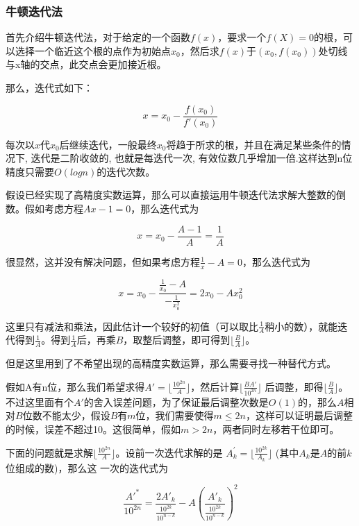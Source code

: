 \documentclass{article}
\begin{document}
\subsubsection{牛顿迭代法}

首先介绍牛顿迭代法，对于给定的一个函数$f(x)$，要求一个$f(X)=0$的根，可以选择一个临近这个根的点作为初始点$x_0$，然后求$f(x)$于$(x_0,f(x_0))$处切线与x轴的交点，此交点会更加接近根。

那么，迭代式如下：

\begin{equation*}
    x=x_0-\frac{f(x_0)}{f'(x_0)}
\end{equation*}

每次以$x$代$x_0$后继续迭代，一般最终$x_0$将趋于所求的根，并且在满足某些条件的情况下, 迭代是二阶收敛的, 也就是每迭代一次, 有效位数几乎增加一倍.这样达到n位精度只需要$O(logn)$的迭代次数。

假设已经实现了高精度实数运算，那么可以直接运用牛顿迭代法求解大整数的倒数。假如考虑方程$Ax-1=0$，那么迭代式为

\begin{equation*}
    x=x_0-\frac{A-1}{A} = \frac{1}{A}
\end{equation*}

很显然，这并没有解决问题，但如果考虑方程$\frac{1}{x} - A=0$，那么迭代式为

\begin{equation*}
    x = x_0 - \frac{\frac{1}{x_0}-A}{-\frac{1}{x_0^2}} = 2x_0-Ax_0^2
\end{equation*}

这里只有减法和乘法，因此估计一个较好的初值（可以取比$\frac{1}{A}$稍小的数），就能迭代得到$\frac{1}{A}$。得到$\frac{1}{A}$后，再乘$B$，取整后调整，即可得到$\lfloor \frac{B}{A} \rfloor$。

但是这里用到了不希望出现的高精度实数运算，那么需要寻找一种替代方式。

假如A有n位，那么我们希望求得$A'=\lfloor \frac{10^{2n}}{A} \rfloor$，然后计算$\lfloor \frac{BA'}{10^{2n}} \rfloor$ 后调整，即得$\lfloor \frac{B}{A} \rfloor$。不过这里面有个$A'$的舍入误差问题，为了保证最后调整次数是$O(1)$的，那么$A$相对$B$位数不能太少，假设$B$有$m$位，我们需要使得$m \leq 2n$，这样可以证明最后调整的时候，误差不超过10。这很简单，假如$m > 2n$，两者同时左移若干位即可。

下面的问题就是求解$\lfloor \frac{10^{2n}}{A} \rfloor$。设前一次迭代求解的是
$A^′_k = \lfloor \frac{10^{2k}} {A_k} \rfloor$ (其中$A_k$是$A$的前$k$位组成的数)，那么这
一次的迭代式为

\begin{equation*}
    \frac{A'^{*}}{10^{2n}} = \frac{2A'_{k}}{\frac{10^{2k}}{10^{n-k}}}-A(\frac{A'_{k}}{\frac{10^{2k}}{10^{n-k}}})^2
\end{equation*}
\end{document}
